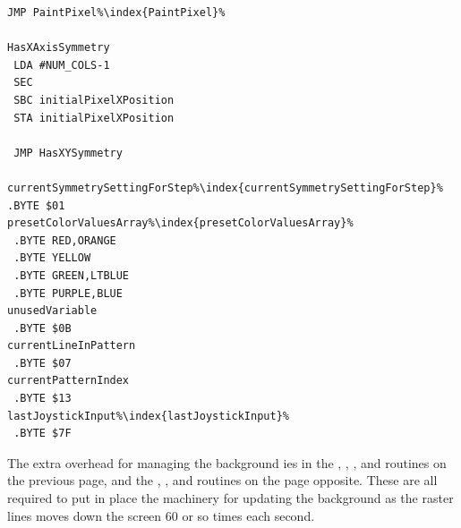 \begin{minipage}[b]{0.33\linewidth}
\begin{lrbox}{\mybox}
\begin{lstlisting}[basicstyle=\ttfamily\tiny,escapechar=\%]
 JMP PaintPixel%\index{PaintPixel}%

HasXAxisSymmetry   
 LDA #NUM_COLS-1
 SEC 
 SBC initialPixelXPosition
 STA initialPixelXPosition

 JMP HasXYSymmetry

currentSymmetrySettingForStep%\index{currentSymmetrySettingForStep}%
.BYTE $01
presetColorValuesArray%\index{presetColorValuesArray}%        
 .BYTE RED,ORANGE
 .BYTE YELLOW
 .BYTE GREEN,LTBLUE
 .BYTE PURPLE,BLUE
unusedVariable                
 .BYTE $0B
currentLineInPattern          
 .BYTE $07
currentPatternIndex           
 .BYTE $13
lastJoystickInput%\index{lastJoystickInput}%
 .BYTE $7F

\end{lstlisting}
\end{lrbox}%
\scalebox{0.8}{\usebox{\mybox}}
\end{minipage}
The extra overhead for managing the background ies in the , , , and
 routines on the previous page, and the , , and
 routines on the page opposite. These are all required to put in place the machinery for updating the background as the raster
lines moves down the screen 60 or so times each second. 

